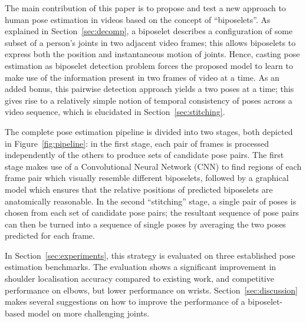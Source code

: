 \documentclass[runningheads]{llncs}
\begin{document}
The main contribution of this paper is to propose and test a new approach to
human pose estimation in videos based on the concept of ``biposelets''. As
explained in Section~\ref{sec:decomp}, a biposelet describes a configuration of
some subset of a person's joints in two adjacent video frames; this allows
biposelets to express both the position and instantaneous motion of joints.
Hence, casting pose estimation as biposelet detection problem forces the
proposed model to learn to make use of the information present in two frames of
video at a time. As an added bonus, this pairwise detection approach yields a
two poses at a time; this gives rise to a relatively simple notion of temporal
consistency of poses across a video sequence, which is elucidated in
Section~\ref{sec:stitching}.

The complete pose estimation pipeline is divided into two stages, both depicted
in Figure~\ref{fig:pipeline}: in the first stage, each pair of frames is
processed independently of the others to produce sets of candidate pose pairs.
The first stage makes use of a Convolutional Neural Network (CNN) to find
regions of each frame pair which visually resemble different biposelets,
followed by a graphical model which ensures that the relative positions of
predicted biposelets are anatomically reasonable. In the second ``stitching''
stage, a single pair of poses is chosen from each set of candidate pose pairs;
the resultant sequence of pose pairs can then be turned into a sequence of
single poses by averaging the two poses predicted for each frame.

In Section~\ref{sec:experiments}, this strategy is evaluated on three
established pose estimation benchmarks. The evaluation shows a significant
improvement in shoulder localisation accuracy compared to existing work, and
competitive performance on elbows, but lower performance on wrists.
Section~\ref{sec:discussion} makes several suggestions on how to improve the
performance of a biposelet-based model on more challenging joints.
\end{document}
